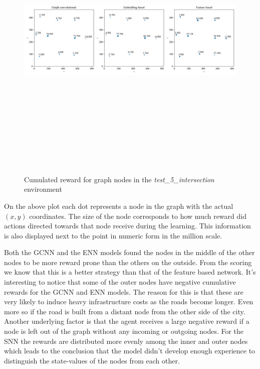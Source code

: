 \documentclass[
]{elteikthesis}[2023/04/10]
\begin{document}
\begin{figure}[H]
\begin{centering}
\includegraphics[width=14cm,height=14cm,keepaspectratio]{images/node_reward_plot_node_weights_plot_test_5_intersection}
\par\end{centering}
\caption{Cumulated reward for graph nodes in the \emph{test\_5\_intersection}
environment}
\end{figure}

On the above plot each dot represents a node in the graph with the
actual $(x,y)$ coordinates. The size of the node corresponds to how
much reward did actions directed towards that node receive during
the learning. This information is also displayed next to the point
in numeric form in the million scale. 

Both the GCNN and the ENN models found the nodes in the middle of
the other nodes to be more reward prone than the others on the outside.
From the scoring we know that this is a better strategy than that
of the feature based network. It's interesting to notice that some
of the outer nodes have negative cumulative rewards for the GCNN and
ENN models. The reason for this is that these are very likely to induce
heavy infrastructure costs as the roads become longer. Even more so
if the road is built from a distant node from the other side of the
city. Another underlying factor is that the agent receives a large
negative reward if a node is left out of the graph without any incoming
or outgoing nodes. For the SNN the rewards are distributed more evenly
among the inner and outer nodes which leads to the conclusion that
the model didn't develop enough experience to distinguish the state-values
of the nodes from each other. 
\end{document}
